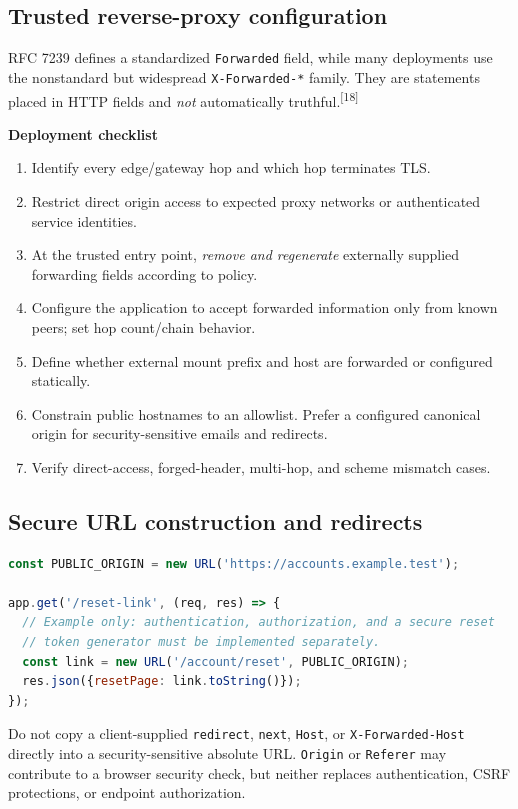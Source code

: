 \documentclass[10pt,letterpaper,oneside]{article}
\newcommand{\refs}[1]{\textsuperscript{\color{blue}[#1]}}
\newcommand{\code}[1]{\texttt{#1}}
\begin{document}
\subsection{Trusted reverse-proxy configuration}
RFC 7239 defines a standardized \code{Forwarded} field, while many deployments use the nonstandard but widespread \code{X-Forwarded-*} family. They are statements placed in HTTP fields and \emph{not} automatically truthful.\refs{18}
\begin{keybox}
\textbf{Deployment checklist}\par
\begin{enumerate}
\item Identify every edge/gateway hop and which hop terminates TLS.
\item Restrict direct origin access to expected proxy networks or authenticated service identities.
\item At the trusted entry point, \emph{remove and regenerate} externally supplied forwarding fields according to policy.
\item Configure the application to accept forwarded information only from known peers; set hop count/chain behavior.
\item Define whether external mount prefix and host are forwarded or configured statically.
\item Constrain public hostnames to an allowlist. Prefer a configured canonical origin for security-sensitive emails and redirects.
\item Verify direct-access, forged-header, multi-hop, and scheme mismatch cases.
\end{enumerate}
\end{keybox}

\subsection{Secure URL construction and redirects}
\begin{lstlisting}[language=JavaScript,caption={Express: configure the canonical public origin rather than trusting Host}]
const PUBLIC_ORIGIN = new URL('https://accounts.example.test');

app.get('/reset-link', (req, res) => {
  // Example only: authentication, authorization, and a secure reset
  // token generator must be implemented separately.
  const link = new URL('/account/reset', PUBLIC_ORIGIN);
  res.json({resetPage: link.toString()});
});
\end{lstlisting}
Do not copy a client-supplied \code{redirect}, \code{next}, \code{Host}, or \code{X-Forwarded-Host} directly into a security-sensitive absolute URL. \code{Origin} or \code{Referer} may contribute to a browser security check, but neither replaces authentication, CSRF protections, or endpoint authorization.
\end{document}
